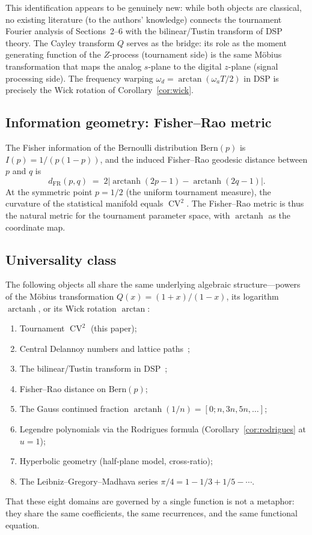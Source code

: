 \documentclass[11pt]{amsart}
\theoremstyle{definition}
\DeclareMathOperator{\CV}{CV}
\DeclareMathOperator{\arctanh}{arctanh}
\DeclareMathOperator{\arctan}{arctan}
\begin{document}
This identification appears to be genuinely new: while both objects are classical, no existing literature (to the authors' knowledge) connects the tournament Fourier analysis of Sections~2--6 with the bilinear/Tustin transform of DSP theory. The Cayley transform $Q$ serves as the bridge: its role as the moment generating function of the $Z$-process (tournament side) is the same M\"obius transformation that maps the analog $s$-plane to the digital $z$-plane (signal processing side). The frequency warping $\omega_d = \arctan(\omega_a T/2)$ in DSP is precisely the Wick rotation of Corollary~\ref{cor:wick}.

\subsection{Information geometry: Fisher--Rao metric}

The Fisher information of the Bernoulli distribution $\mathrm{Bern}(p)$ is $I(p) = 1/(p(1-p))$, and the induced Fisher--Rao geodesic distance between $p$ and $q$ is
\[
d_{\mathrm{FR}}(p,q) \;=\; 2\left|\arctanh(2p - 1) - \arctanh(2q - 1)\right|.
\]
At the symmetric point $p = 1/2$ (the uniform tournament measure), the curvature of the statistical manifold equals $\CV^2$. The Fisher--Rao metric is thus the natural metric for the tournament parameter space, with $\arctanh$ as the coordinate map.

\subsection{Universality class}

The following objects all share the same underlying algebraic structure---powers of the M\"obius transformation $Q(x) = (1+x)/(1-x)$, its logarithm $\arctanh$, or its Wick rotation $\arctan$:
\begin{enumerate}
\item Tournament $\CV^2$ (this paper);
\item Central Delannoy numbers and lattice paths~\cite{sulanke, hetyei2009};
\item The bilinear/Tustin transform in DSP~\cite{marcus-roth-siegel};
\item Fisher--Rao distance on $\mathrm{Bern}(p)$;
\item The Gauss continued fraction $\arctanh(1/n) = [0; n, 3n, 5n, \ldots]$;
\item Legendre polynomials via the Rodrigues formula (Corollary~\ref{cor:rodrigues} at $u = 1$);
\item Hyperbolic geometry (half-plane model, cross-ratio);
\item The Leibniz--Gregory--Madhava series $\pi/4 = 1 - 1/3 + 1/5 - \cdots$.
\end{enumerate}
That these eight domains are governed by a single function is not a metaphor: they share the same coefficients, the same recurrences, and the same functional equation.
\end{document}
